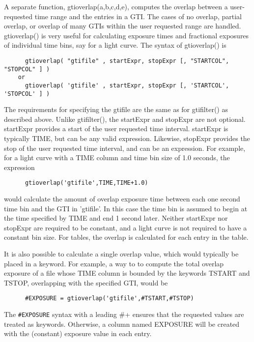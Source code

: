 \documentclass[11pt]{book}
\begin{document}
    A separate function, gtioverlap(a,b,c,d,e), computes the overlap
    between a user-requested time range and the entries in a GTI.  The
    cases of no overlap, partial overlap, or overlap of many GTIs
    within the user requested range are handled.  gtioverlap() is very
    useful for calculating exposure times and fractional exposures of
    individual time bins, say for a light curve.  The syntax of
    gtioverlap() is

\begin{verbatim}
      gtioverlap( "gtifile" , startExpr, stopExpr [, "STARTCOL", "STOPCOL" ] )
    or
      gtioverlap( 'gtifile' , startExpr, stopExpr [, 'STARTCOL', 'STOPCOL' ] )
\end{verbatim}

    The requirements for specifying the gtifile are the same as for
    gtifilter() as described above.  Unlike gtifilter(), the startExpr
    and stopExpr are not optional.  startExpr provides a start of the
    user requested time interval.  startExpr is typically TIME, but
    can be any valid expression.  Likewise, stopExpr provides the stop
    of the user requested time interval, and can be an expression.
    For example, for a light curve with a TIME column and time bin
    size of 1.0 seconds, the expression

\begin{verbatim}
      gtioverlap('gtifile',TIME,TIME+1.0)
\end{verbatim}

    would calculate the amount of overlap exposure time between each
    one second time bin and the GTI in 'gtifile'.  In this case the
    time bin is assumed to begin at the time specified by TIME and end
    1 second later.  Neither startExpr nor stopExpr are required to be
    constant, and a light curve is not required to have a constant bin
    size.  For tables, the overlap is calculated for each entry in the
    table.

    It is also possible to calculate a single overlap value, which
    would typically be placed in a keyword.  For example, a way to to
    compute the total overlap exposure of a file whose TIME column is
    bounded by the keywords TSTART and TSTOP, overlapping with the
    specified GTI, would be

\begin{verbatim}
      #EXPOSURE = gtioverlap('gtifile',#TSTART,#TSTOP)
\end{verbatim}

    The \verb+#EXPOSURE+ syntax with a leading \+#+ ensures that the 
    requested values are treated as keywords.  Otherwise, a column
    named EXPOSURE will be created with the (constant) exposure value
    in each entry.  
\end{document}
